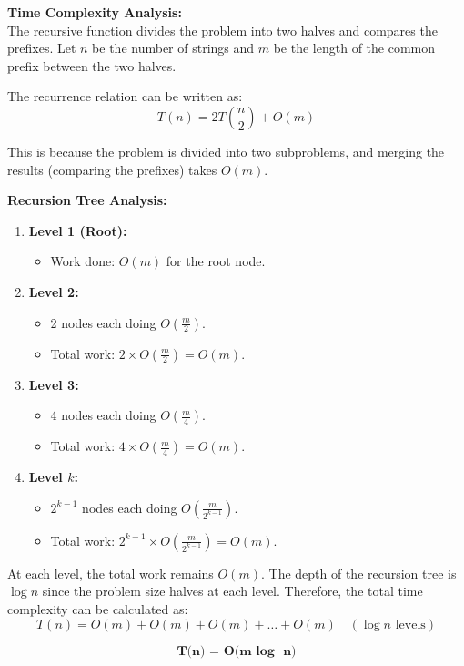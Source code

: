 \documentclass[a4paper,12pt]{report}
\begin{document}
\large \textbf{Time Complexity Analysis:} \hfill \\

The recursive function divides the problem into two halves and compares the prefixes. Let \(n\) be the number of strings and \(m\) be the length of the common prefix between the two halves.

The recurrence relation can be written as:
\[
T(n) = 2T\left(\frac{n}{2}\right) + O(m)
\]

This is because the problem is divided into two subproblems, and merging the results (comparing the prefixes) takes \(O(m)\).

\vspace{1cm}
\textbf{Recursion Tree Analysis:}\hfill \\
\begin{enumerate}
    \item \textbf{Level 1 (Root):} 
    \begin{itemize}
        \item Work done: \(O(m)\) for the root node.
    \end{itemize}
    \item \textbf{Level 2:} 
    \begin{itemize}
        \item 2 nodes each doing \(O\left(\frac{m}{2}\right)\).
        \item Total work: \(2 \times O\left(\frac{m}{2}\right) = O(m)\).
    \end{itemize}
    \item \textbf{Level 3:} 
    \begin{itemize}
        \item 4 nodes each doing \(O\left(\frac{m}{4}\right)\).
        \item Total work: \(4 \times O\left(\frac{m}{4}\right) = O(m)\).
    \end{itemize}
    \item \textbf{Level \(k\):}
    \begin{itemize}
        \item \(2^{k-1}\) nodes each doing \(O\left(\frac{m}{2^{k-1}}\right)\).
        \item Total work: \(2^{k-1} \times O\left(\frac{m}{2^{k-1}}\right) = O(m)\).
    \end{itemize}
\end{enumerate}

At each level, the total work remains \(O(m)\). The depth of the recursion tree is \(\log n\) since the problem size halves at each level. Therefore, the total time complexity can be calculated as:
\[
T(n) = O(m) + O(m) + O(m) + \ldots + O(m) \quad (\log n \text{ levels})
\]
\begin{tcolorbox}[colback=white, colframe=black, boxrule=0.5pt] %
\[
\textbf {T(n) = O(m {log } n)}
\]
\end{tcolorbox}
\end{document}
